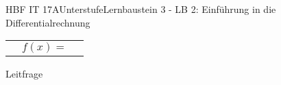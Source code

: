 \documentclass[oneside,openany,headings=optiontotoc,11pt,numbers=noenddot]{scrreprt}
\begin{document}
	\begin{worksheet}{HBF IT 17A}{Unterstufe}{Lernbaustein 3 - LB 2: Einführung in die Differentialrechnung}
		
		\noindent
		\begin{framed}
			\begin{tabular}{lcr}
				& \(f(x) = \) &
			\end{tabular}
		\end{framed}

		\setlength{\fboxsep}{1mm}
		\begin{framed}
			\tiny{\color{codegray}Leitfrage}
			\par
			\bigskip
		\end{framed}
	
		\begin{framed}
			
		\end{framed}
		
		\begin{framed}
			
		\end{framed}		
	\end{worksheet}
\end{document}
